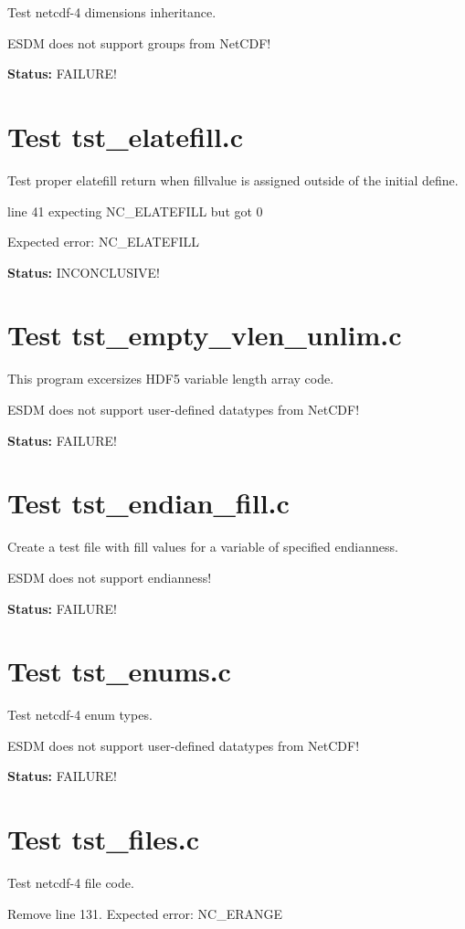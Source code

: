 Test netcdf-4 dimensions inheritance.

ESDM does not support groups from NetCDF!

{\bf \large Status: } FAILURE!

\section{Test tst\_elatefill.c}

Test proper elatefill return when fillvalue is assigned outside of
the initial define.

line 41 expecting NC\_ELATEFILL but got 0

Expected error: NC\_ELATEFILL

{\bf \large Status: } INCONCLUSIVE!

\section{Test tst\_empty\_vlen\_unlim.c}

This program excersizes HDF5 variable length array code.

ESDM does not support user-defined datatypes from NetCDF!

{\bf \large Status: } FAILURE!

\section{Test tst\_endian\_fill.c}

Create a test file with fill values for a variable of specified endianness.

ESDM does not support endianness!

{\bf \large Status: } FAILURE!

\section{Test tst\_enums.c}

Test netcdf-4 enum types.

ESDM does not support user-defined datatypes from NetCDF!

{\bf \large Status: } FAILURE!

\section{Test tst\_files.c}

Test netcdf-4 file code.

Remove line 131. Expected error: NC\_ERANGE

